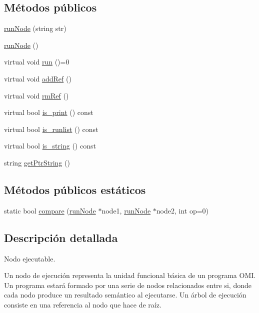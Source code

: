 \subsection*{Métodos públicos}
\begin{DoxyCompactItemize}
\item 
\hyperlink{classrunNode_a39886db07c6112feb82a84ff0d28c29a}{run\-Node} (string str)
\item 
\hyperlink{classrunNode_ac3bfbc4522d49085eab96f8129ba9d72}{run\-Node} ()
\item 
virtual void \hyperlink{classrunNode_a83c10df8148829b08e04153c93d69eec}{run} ()=0
\item 
virtual void \hyperlink{classrunNode_ab4a07d831845eadea0d2d088dc106288}{add\-Ref} ()
\item 
virtual void \hyperlink{classrunNode_a8d0761660753ceb2c98836614c526a45}{rm\-Ref} ()
\item 
virtual bool \hyperlink{classrunNode_ad65c9a22e807dbe18f5c83c84d777d44}{is\-\_\-print} () const 
\item 
virtual bool \hyperlink{classrunNode_a231638d0fc5b436c5e4a664fe7d5126a}{is\-\_\-runlist} () const 
\item 
virtual bool \hyperlink{classrunNode_a3fda5276a76f39ad12d316794a892b06}{is\-\_\-string} () const 
\item 
string \hyperlink{classrunNode_a7f789742e86bc7c897defe1073a26c65}{get\-Ptr\-String} ()
\end{DoxyCompactItemize}
\subsection*{Métodos públicos estáticos}
\begin{DoxyCompactItemize}
\item 
static bool \hyperlink{classrunNode_ab54d457f51ddd7254dc9e90e78c69f95}{compare} (\hyperlink{classrunNode}{run\-Node} $\ast$node1, \hyperlink{classrunNode}{run\-Node} $\ast$node2, int op=0)
\end{DoxyCompactItemize}


\subsection{Descripción detallada}
Nodo ejecutable. 

Un nodo de ejecución representa la unidad funcional básica de un programa O\-M\-I. Un programa estará formado por una serie de nodos relacionados entre si, donde cada nodo produce un resultado semántico al ejecutarse. Un árbol de ejecución consiste en una referencia al nodo que hace de raíz.

